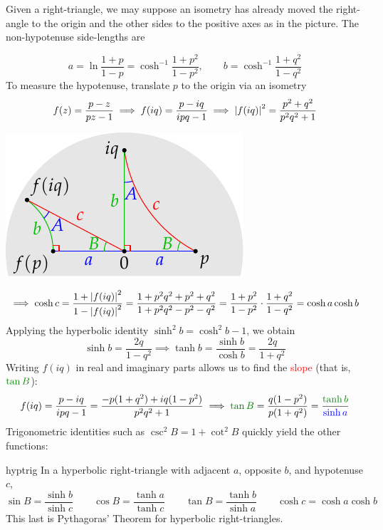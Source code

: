 Given a right-triangle, we may suppose an isometry has already moved the right-angle to the origin and the other sides to the positive axes as in the picture. The non-hypotenuse side-lengths are\par
\begin{minipage}[t]{0.675\linewidth}\vspace{-8pt}
	\[
		a=\ln\frac{1+p}{1-p}=\cosh^{-1}\frac{1+p^2}{1-p^2},\qquad b=\cosh^{-1}\frac{1+q^2}{1-q^2}
	\]
	To measure the hypotenuse, translate $p$ to the origin via an isometry
	\[
		f(z)=\frac{p-z}{pz-1} \implies f(iq)=\frac{p-iq}{ipq-1} \implies \left| f(iq)\right|^2=\frac{p^2+q^2}{p^2q^2+1}
	\]
\end{minipage}
\hfill
\begin{minipage}[t]{0.3\linewidth}\vspace{0pt}
	\flushright\includegraphics[scale=0.9]{isom-right}
\end{minipage}\par
\[
	\implies \cosh c=\frac{1+\left| f(iq)\right|^2}{1-\left| f(iq)\right|^2}  
	=\frac{1+p^2q^2+p^2+q^2}{1+p^2q^2-p^2-q^2} 
	=\frac{1+p^2}{1-p^2}\cdot\frac{1+q^2}{1-q^2} 
	=\cosh a\cosh b
\]
Applying the hyperbolic identity $\sinh^2b=\cosh^2b-1$, we obtain
\[
	\sinh b=\frac{2q}{1-q^2}\implies \tanh b=\frac{\sinh b}{\cosh b} =\frac{2q}{1+q^2}
\]
Writing $f(iq)$ in real and imaginary parts allows us to find the \textcolor{red}{slope} (that is, $\textcolor{Green}{\tan B}$):
\[
	f(iq)=\frac{p-iq}{ipq-1} =\frac{-p(1+q^2)+iq(1-p^2)}{p^2q^2+1}\implies \textcolor{Green}{\tan B}=\frac{q(1-p^2)}{p(1+q^2)} =\frac{\textcolor{Green}{\tanh b}}{\textcolor{blue}{\sinh a}}
\]
Trigonometric identities such as $\csc^2B=1+\cot^2B$ quickly yield the other functions:

\begin{thm}{}{hyptrig}
	In a hyperbolic right-triangle with adjacent $a$, opposite $b$, and hypotenuse $c$,
	\[
		\sin B=\frac{\sinh b}{\sinh c}\qquad \cos B=\frac{\tanh a}{\tanh c}\qquad  \tan B=\frac{\tanh b}{\sinh a}\qquad \cosh c=\cosh a\cosh b
	\]
	This last is Pythagoras' Theorem for hyperbolic right-triangles.
\end{thm}

